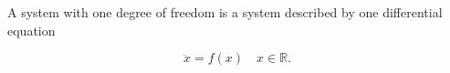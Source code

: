A system with one degree of freedom is a system described by one differential equation

$$\ddot{x} = f(x) \quad x \in \mathbb{R}.$$

